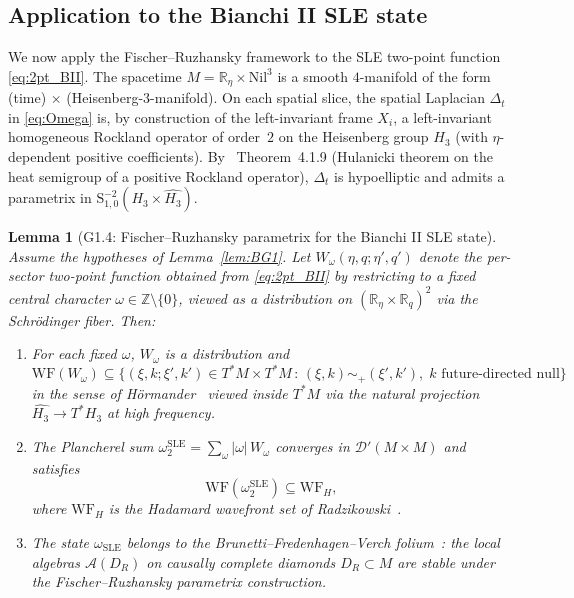 \documentclass[11pt, a4paper]{article}
\newtheorem{lemma}[theorem]{Lemma}
\newcommand{\RR}{\mathbb{R}}
\newcommand{\ZZ}{\mathbb{Z}}
\newcommand{\Hgroup}{H_3}
\newcommand{\Nil}{\mathrm{Nil}^3}
\newcommand{\WF}{\mathrm{WF}}
\newcommand{\om}{\omega}
\newcommand{\Sym}{\mathrm{S}}
\newcommand{\dGhat}{\widehat{\Hgroup}}
\begin{document}
\subsection{Application to the Bianchi II SLE state}

We now apply the Fischer--Ruzhansky framework to the SLE two-point function
\eqref{eq:2pt_BII}. The spacetime $M=\RR_\eta\times\Nil$ is a smooth $4$-manifold
of the form (time)$\,\times\,$(Heisenberg-$3$-manifold). On each spatial
slice, the spatial Laplacian $\Delta_t$ in \eqref{eq:Omega} is, by
construction of the left-invariant frame $X_i$, a left-invariant
homogeneous Rockland operator of order~$2$ on the Heisenberg group
$\Hgroup$ (with $\eta$-dependent positive coefficients). By
\cite{FR16}~Theorem~4.1.9 (Hulanicki theorem on the heat semigroup of a
positive Rockland operator), $\Delta_t$ is hypoelliptic and admits a
parametrix in $\Sym^{-2}_{1,0}(\Hgroup\times\dGhat)$.

\begin{lemma}[G1.4: Fischer--Ruzhansky parametrix for the Bianchi II SLE state]
\label{lem:G14}
Assume the hypotheses of Lemma~\ref{lem:BG1}. Let $W_\om(\eta,q;\eta',q')$
denote the per-sector two-point function obtained from \eqref{eq:2pt_BII}
by restricting to a fixed central character $\om\in\ZZ\setminus\{0\}$, viewed
as a distribution on $(\RR_\eta\times\RR_q)^2$ via the Schrödinger
fiber. Then:
\begin{enumerate}[label=\textup{(\alph*)}]
  \item For each fixed $\om$, $W_\om$ is a distribution and
        \begin{equation}\label{eq:WF_omega}
          \WF(W_\om) \subseteq
          \{(\xi,k;\xi',k')\in T^*M\times T^*M\,:\,(\xi,k)\sim_+(\xi',k'),
          \;k\text{ future-directed null}\}
        \end{equation}
        in the sense of Hörmander~\cite{HormIII} viewed inside $T^*M$ via
        the natural projection $\dGhat\to T^*\Hgroup$ at high frequency.
  \item The Plancherel sum
        $\omega_2^{\mathrm{SLE}}=\sum_\om|\om|\,W_\om$ converges in
        $\mathcal D'(M\times M)$ and satisfies
        \begin{equation}\label{eq:WF_total}
          \WF(\omega_2^{\mathrm{SLE}}) \subseteq \WF_H,
        \end{equation}
        where $\WF_H$ is the Hadamard wavefront set of Radzikowski~\cite{Rad96}.
  \item The state $\omega_{\mathrm{SLE}}$ belongs to the Brunetti--Fredenhagen--Verch
        folium~\cite{BFV03}: the local algebras $\mathcal A(D_R)$ on causally
        complete diamonds $D_R\subset M$ are stable under the Fischer--Ruzhansky
        parametrix construction.
\end{enumerate}
\end{lemma}
\end{document}
